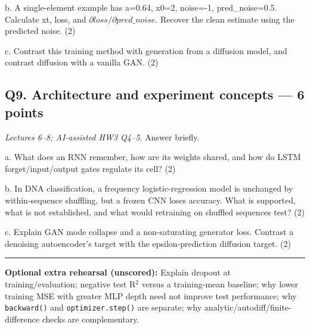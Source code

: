 \documentclass[11pt]{article}
\begin{document}
b. A single-element example has a=0.64, x0=2, noise=-1, pred\_noise=0.5. Calculate xt, loss, and $\partial loss/\partial pred\_noise$. Recover the clean estimate using the predicted noise. (2)

c. Contrast this training method with generation from a diffusion model, and contrast diffusion with a vanilla GAN. (2)

\subsection*{Q9. Architecture and experiment concepts — 6 points}

\emph{Lectures 6–8; AI-assisted HW3 Q4–5.} Answer briefly.

a. What does an RNN remember, how are its weights shared, and how do LSTM forget/\allowbreak{}input/\allowbreak{}output gates regulate its cell? (2)

b. In DNA classification, a frequency logistic-regression model is unchanged by within-sequence shuffling, but a frozen CNN loses accuracy. What is supported, what is not established, and what would retraining on shuffled sequences test? (2)

c. Explain GAN mode collapse and a non-saturating generator loss. Contrast a denoising autoencoder's target with the epsilon-prediction diffusion target. (2)

\par\noindent\rule{\linewidth}{0.4pt}\par

\textbf{Optional extra rehearsal (unscored):} Explain dropout at training/\allowbreak{}evaluation; negative test R\ensuremath{{}^2} versus a training-mean baseline; why lower training MSE with greater MLP depth need not improve test performance; why \texttt{backward()} and \texttt{optimizer.step()} are separate; why analytic/\allowbreak{}autodiff/\allowbreak{}finite-difference checks are complementary.
\end{document}
